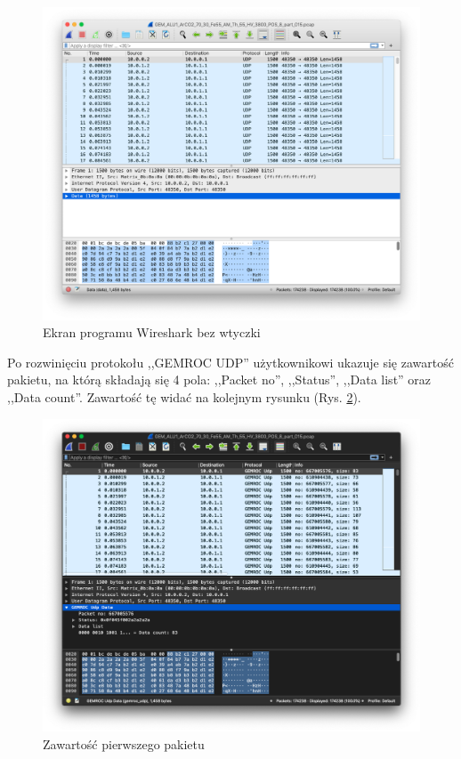 \documentclass[a4paper, 11pt, twoside, openright]{article}
\begin{document}
		\begin{figure}[h]
			\centering
				\includegraphics[width=1.0\textwidth]{img/screenshot_no_dissector.png}
			\caption{Ekran programu Wireshark bez wtyczki}
			\label{fig:no_dis}
		\end{figure}


	Po rozwinięciu protokołu ,,GEMROC UDP'' użytkownikowi ukazuje się zawartość pakietu, na którą
	składają się 4 pola: ,,Packet no'', ,,Status'', ,,Data list'' oraz ,,Data count''.
	Zawartość tę widać na kolejnym rysunku (Rys. \ref{fig:dis_pack}).

		\begin{figure}[h]
			\centering
				\includegraphics[width=1.0\textwidth]{img/screenshot_dissector_list.png}
			\caption{Zawartość pierwszego pakietu}
			\label{fig:dis_pack}
		\end{figure}
\end{document}
